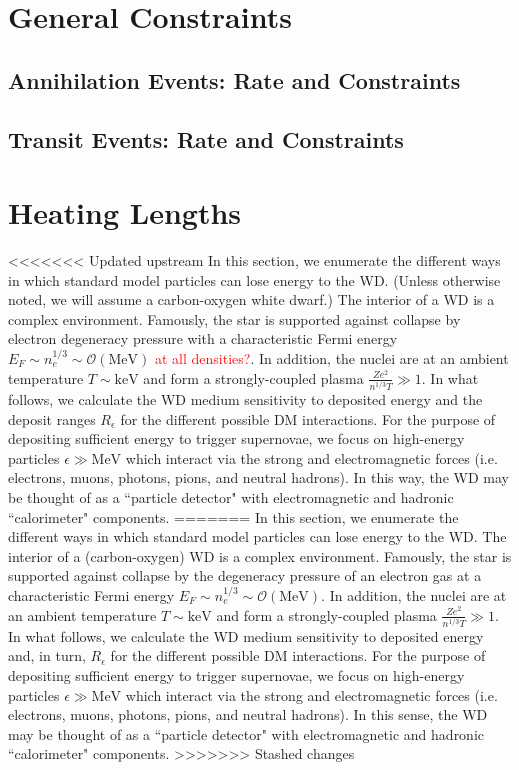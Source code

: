 \documentclass[twocolumn,showpacs,preprintnumbers,amsmath,amssymb,prl]{revtex4}
\newcommand{\OO}{\mathcal{O}}
\begin{document}
\section{General Constraints}

\subsection{Annihilation Events: Rate and Constraints}

\subsection{Transit Events: Rate and Constraints}

\section{Heating Lengths}
\label{sec:heatinglengthsummary}

<<<<<<< Updated upstream
In this section, we enumerate the different ways in which standard model particles can lose energy to the WD. (Unless otherwise noted, we will assume a carbon-oxygen white dwarf.) The interior of a WD is a complex environment. Famously, the star is supported against collapse by electron degeneracy pressure with a characteristic Fermi energy $E_F \sim n_e^{1/3} \sim \OO(\text{MeV})$ \textcolor{red}{at all densities?}. In addition, the nuclei are at an ambient temperature $T \sim \text{keV}$ and form a strongly-coupled plasma $\frac{Z e^2}{n^{1/3} T} \gg 1$. In what follows, we calculate the WD medium sensitivity to deposited energy and the deposit ranges $R_\epsilon$ for the different possible DM interactions. For the purpose of depositing sufficient energy to trigger supernovae, we focus on high-energy particles $\epsilon \gg \text{MeV}$ which interact via the strong and electromagnetic forces (i.e. electrons, muons, photons, pions, and neutral hadrons). In this way, the WD may be thought of as a ``particle detector" with electromagnetic and hadronic ``calorimeter" components.
=======
In this section, we enumerate the different ways in which standard model particles can lose energy to the WD. The interior of a (carbon-oxygen) WD is a complex environment. Famously, the star is supported against collapse by the degeneracy pressure of an electron gas at a characteristic Fermi energy $E_F \sim n_e^{1/3} \sim \OO(\text{MeV})$. In addition, the nuclei are at an ambient temperature $T \sim \text{keV}$ and form a strongly-coupled plasma $\frac{Z e^2}{n^{1/3} T} \gg 1$. In what follows, we calculate the WD medium sensitivity to deposited energy and, in turn, $R_\epsilon$ for the different possible DM interactions. For the purpose of depositing sufficient energy to trigger supernovae, we focus on high-energy particles $\epsilon \gg \text{MeV}$ which interact via the strong and electromagnetic forces (i.e. electrons, muons, photons, pions, and neutral hadrons). In this sense, the WD may be thought of as a ``particle detector" with electromagnetic and hadronic ``calorimeter" components.  
>>>>>>> Stashed changes
\end{document}
